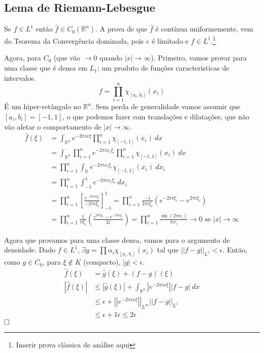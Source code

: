 \documentclass[11pt]{article}
\newcommand{\qed}{$\hfill\square$}
\newcommand{\R}{\mathbb{R}}
\newcommand{\Rn}{{\mathbb{R}^n}}
\newcommand{\e}{\epsilon}
\newcommand{\norm}[2]{\left|\left|#1\right|\right|_{L^{#2}}}
\begin{document}
\subsection{Lema de Riemann-Lebesgue} Se \(f \in L^1\) então \(\hat{f} \in C_0 (\Rn)\).
A prova de que \(\hat{f}\) é contínua uniformemente, vem do Teorema da Convergência dominada, pois \(e\) é limitado e \(f \in L^1\).\footnote{Inserir prova clássica de análise aqui}

Agora, para \(C_0\) (que vão \(\rightarrow0\) quando \(|x|\rightarrow \infty\)). Primeiro, vamos provar para uma classe que é densa em \(L_1\): um produto de funções características de intervalos. \[f = \prod_{i=1}^n \chi_{[a_i,b_i]} (x_i)\] É um hiper-retângulo no \(\Rn\). Sem perda de generalidade vamos assumir que \([a_i,b_i]=[-1,1]\), o que podemos fazer com translações e dilatações, que não vão afetar o comportamento de \(|x|\rightarrow\infty\).
\begin{align*}
	\hat{f}(\xi) &= \int_\Rn e^{-2\pi i x \xi} \prod_{i=1}^n \chi_{[-1,1]} (x_i)\ dx\\
	&= \int_\Rn \prod_{i=1}^{n} e^{-2\pi i x_i \xi_i} \prod_{i=1}^n \chi_{[-1,1]} (x_i)\ dx\\
	&= \prod_{i=1}^{n} \int_\R  e^{-2\pi i x_i \xi_i} \chi_{[-1,1]} (x_i)\ dx_i\\
	&= \prod_{i=1}^{n} \int_{-1}^1  e^{-2\pi i x_i \xi_i} \ dx_i\\
	&= \prod_{i=1}^{n} \left[ \frac{e^{-2\pi i x \xi_i }}{-2\pi i \xi_i}\right]_{-1}^1 = \prod_{i=1}^{n} \frac{-1}{2\pi i \xi_i } \left( e^{-2\pi i \xi_i} - e^{2\pi i \xi_i} \right)\\
	&=\prod_{i=1}^{n} \frac{1}{\pi \xi_i} \left( \frac{e^{2\pi i \xi_i} - e^{-2\pi i \xi_i}}{2i} \right) = \prod_{i=1}^{n} \frac{\sin(2\pi x_i)}{\pi x_i} \rightarrow 0 \text{ se } |x|\rightarrow \infty 
\end{align*}

Agora que provamos para uma classe densa, vamos para o argumento de densidade. Dado \(f \in L^1\), \(\exists g = \prod \alpha_i \chi_{[a_i,b_i]}(x_i)\) tal que \(\norm{f -g }{1} < \e\). Então, como \(g \in C_0\), para \(\xi \notin K\) (compacto), \(|g|<\e\). \begin{align*}
	\hat{f}(\xi) &= \hat{g}(\xi) + ( f -g)^{\hat{}}(\xi) \\
	|\hat{f}(\xi)| &\leq |\hat{g}(\xi)| + \int_\Rn |e^{-2\pi i x \xi}| |f-g|\ dx\\
	 &\leq \e +\norm{e^{-2\pi i x \xi}}{\infty} \norm{f-g}{1}\\
	&\leq \e + 1 \e \leq 2\e
\end{align*}\qed 
\end{document}
